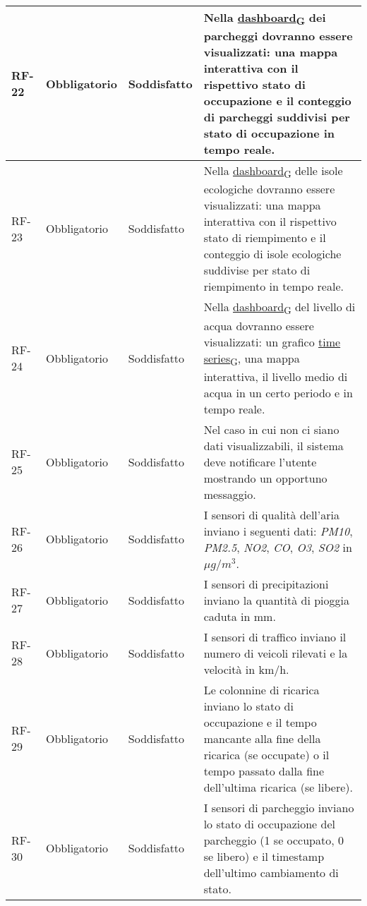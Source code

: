 \begin{longtable}{|>{\centering\arraybackslash}m{}|>{\centering\arraybackslash}m{}|>{\centering\arraybackslash}m{}|>{\centering\arraybackslash}m{}|}
	\\\hline
	RF-22           & Obbligatorio        & Soddisfatto & Nella \href{https://7last.github.io/docs/rtb/documentazione-interna/glossario\#dashboard}{dashboard\textsubscript{G}} dei parcheggi dovranno essere visualizzati: una mappa interattiva con il rispettivo stato di occupazione e il conteggio di parcheggi suddivisi per stato di occupazione in tempo reale.
	\\\hline
	RF-23           & Obbligatorio        & Soddisfatto & Nella \href{https://7last.github.io/docs/rtb/documentazione-interna/glossario\#dashboard}{dashboard\textsubscript{G}} delle isole ecologiche dovranno essere visualizzati: una mappa interattiva con il rispettivo stato di riempimento e il conteggio di isole ecologiche suddivise per stato di riempimento in tempo reale.
	\\\hline
	RF-24           & Obbligatorio        & Soddisfatto & Nella \href{https://7last.github.io/docs/rtb/documentazione-interna/glossario\#dashboard}{dashboard\textsubscript{G}} del livello di acqua dovranno essere visualizzati: un grafico \href{https://7last.github.io/docs/rtb/documentazione-interna/glossario\#time-series}{time series\textsubscript{G}}, una mappa interattiva, il livello medio di acqua in un certo periodo e in tempo reale.
	\\\hline
	RF-25           & Obbligatorio        & Soddisfatto & Nel caso in cui non ci siano dati visualizzabili, il sistema deve notificare l'utente mostrando un opportuno messaggio.
	\\\hline
	RF-26           & Obbligatorio        & Soddisfatto & I sensori di qualità dell'aria inviano i seguenti dati: \textit{PM10}, \textit{PM2.5}, \textit{NO2}, \textit{CO}, \textit{O3}, \textit{SO2} in $\mu g/m^3$.
	\\\hline
	RF-27           & Obbligatorio        & Soddisfatto & I sensori di precipitazioni inviano la quantità di pioggia caduta in mm.
	\\\hline
	RF-28           & Obbligatorio        & Soddisfatto & I sensori di traffico inviano il numero di veicoli rilevati e la velocità in km/h.
	\\\hline
	RF-29           & Obbligatorio        & Soddisfatto & Le colonnine di ricarica inviano lo stato di occupazione e il tempo mancante alla fine della ricarica (se occupate) o il tempo passato dalla fine dell'ultima ricarica (se libere).
	\\\hline
	RF-30           & Obbligatorio        & Soddisfatto & I sensori di parcheggio inviano lo stato di occupazione del parcheggio (1 se occupato, 0 se libero) e il timestamp dell'ultimo cambiamento di stato.

\end{longtable}
